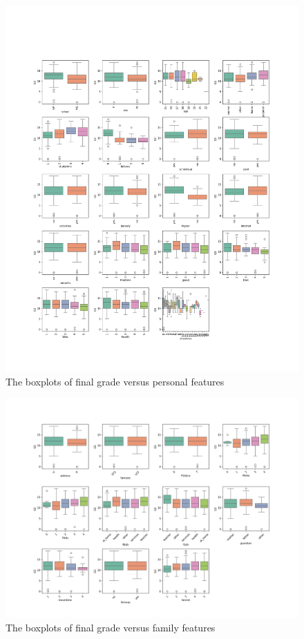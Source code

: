 \documentclass[sn-mathphys-num]{sn-jnl}%
\theoremstyle{thmstyleone}%
\theoremstyle{thmstyletwo}%
\theoremstyle{thmstylethree}%
\begin{document}
\begin{figure}[h]
    \centering
    \includegraphics[width=1\textwidth]{figure/fig3_personal_features.png}
    \caption{The boxplots of final grade versus personal features}
\end{figure}

\begin{figure}[h]
    \centering
    \includegraphics[width=1\textwidth]{figure/fig4_family_features.png}
    \caption{The boxplots of final grade versus family features}
\end{figure}
\end{document}
